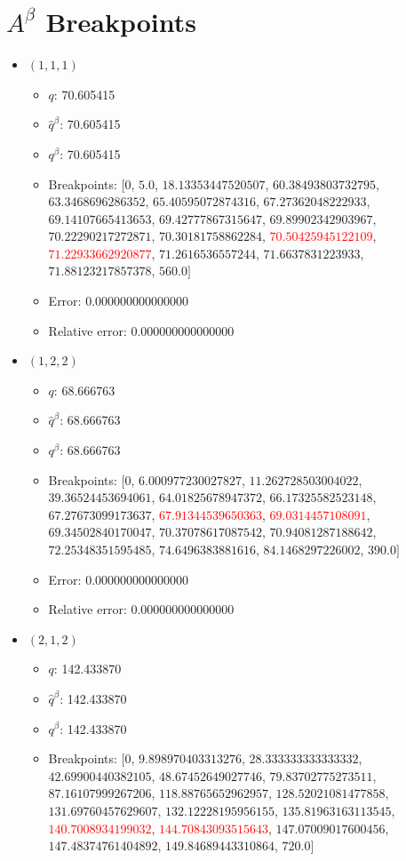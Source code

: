 \documentclass{article}%
\begin{document}
\section{$A^\beta$ Breakpoints}%
\thispagestyle{plain}%
\begin{itemize}%
	\item $(1, 1, 1)$%
	\begin{itemize}%
		\item $q$: 70.605415%
		\item $\hat{q}^\beta$: 70.605415%
		\item $q^\beta$: 70.605415%
		\item Breakpoints: $[$$0$, $5.0$, $18.13353447520507$, $60.38493803732795$, $63.3468696286352$, $65.40595072874316$, $67.27362048222933$, $69.14107665413653$, $69.42777867315647$, $69.89902342903967$, $70.22290217272871$, $70.30181758862284$, \textcolor{red}{$70.50425945122109$}, \textcolor{red}{$71.22933662920877$}, $71.2616536557244$, $71.6637831223933$, $71.88123217857378$, $560.0$$]$%
		\item Error: 0.000000000000000%
		\item Relative error: 0.000000000000000%
	\end{itemize}%
	\item $(1, 2, 2)$%
	\begin{itemize}%
		\item $q$: 68.666763%
		\item $\hat{q}^\beta$: 68.666763%
		\item $q^\beta$: 68.666763%
		\item Breakpoints: $[$$0$, $6.000977230027827$, $11.262728503004022$, $39.36524453694061$, $64.01825678947372$, $66.17325582523148$, $67.27673099173637$, \textcolor{red}{$67.91344539650363$}, \textcolor{red}{$69.0314457108091$}, $69.34502840170047$, $70.37078617087542$, $70.94081287188642$, $72.25348351595485$, $74.6496383881616$, $84.1468297226002$, $390.0$$]$%
		\item Error: 0.000000000000000%
		\item Relative error: 0.000000000000000%
	\end{itemize}%
	\item $(2, 1, 2)$%
	\begin{itemize}%
		\item $q$: 142.433870%
		\item $\hat{q}^\beta$: 142.433870%
		\item $q^\beta$: 142.433870%
		\item Breakpoints: $[$$0$, $9.898970403313276$, $28.333333333333332$, $42.69900440382105$, $48.67452649027746$, $79.83702775273511$, $87.16107999267206$, $118.88765652962957$, $128.52021081477858$, $131.69760457629607$, $132.12228195956155$, $135.81963163113545$, \textcolor{red}{$140.7008934199032$}, \textcolor{red}{$144.70843093515643$}, $147.07009017600456$, $147.48374761404892$, $149.84689443310864$, $720.0$$]$%

\end{itemize}
\end{itemize}
\end{document}
